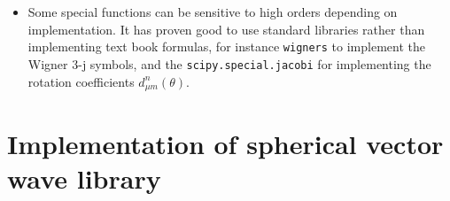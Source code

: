 \documentclass[a4paper,12pt]{article}
\newcommand{\mrm}[1]{\mathrm{#1}}
\newcommand{\diff}{\operatorname{d}\!}
\newcommand{\iu}{\mrm{i}}
\newcommand{\eu}{\mrm{e}}
\begin{document}
\begin{itemize}
\begin{equation}
  \end{equation}
  For integers $\nu=n$ and $\mu=m$, we have
  $\Gamma(n-m+1)/\Gamma(n+m+1) = (n-m)!/(n+m)!$ and $\sin(m\pi)=0$,
  hence for $-1<x<1$ we have
  $\eu^{\pm\iu(-m)\pi/2}\operatorname{P}_{n}^{-m}(x) =
  \frac{(n-m)!}{(n+m)!}\eu^{\pm\iu
    m\pi/2}\operatorname{P}_{n}^{m}(x)$, and in particular
  $\operatorname{P}_{n}^{-1}(x) =
  -\frac{1}{n(n+1)}\operatorname{P}_{n}^{1}(x)$. Hence, the derivative
  can be written
  \begin{equation}
    \frac{\diff\operatorname{P}_{n}^{m}(x)}{\diff x} =
    \begin{cases}
      -\frac{1}{\sqrt{1-x^{2}}}\operatorname{P}_{n}^{1}(x) & m=0 \\
      \frac{(n+m)(n-m+1)}{\sqrt{1-x^{2}}}\operatorname{P}_{n}^{m-1}(x) + \frac{mx}{1-x^{2}}\operatorname{P}_{n}^{m}(x) & m=1,2,\ldots
    \end{cases}
    \label{eq:dPmndx}
  \end{equation}  
  To summarize, the functions $P_{n}^{m}(x)$ used in Hansen correspond
  to the functions $\operatorname{P}_{n}^{m}(x)$ implemented in
  scipy.special.lpmv as
  \begin{align}
    P_{n}^{m}(x) &= (-1)^{m}\operatorname{P}_{n}^{m}(x) \\
    \frac{\diff P_{n}^{m}(\cos\theta)}{\diff\theta} &= (-\sin\theta)\frac{\diff P_{n}^{m}(\cos\theta)}{\diff(\cos\theta)} = (-1)^{m}(-\sin\theta)\frac{\diff\operatorname{P}_{n}^{m}(\cos\theta)}{\diff(\cos\theta)}
  \end{align}
  with $\frac{\diff\operatorname{P}_{n}^{m}(x)}{\diff x}$ defined in
  \eqref{eq:dPmndx}.

\item Some special functions can be sensitive to high orders depending
  on implementation. It has proven good to use standard libraries
  rather than implementing text book formulas, for instance
  \verb+wigners+ to implement the Wigner 3-j symbols, and the
  \verb+scipy.special.jacobi+ for implementing the rotation
  coefficients $d^{n}_{\mu m}(\theta)$.
\end{itemize}

\section{Implementation of spherical vector wave library}
\end{document}
